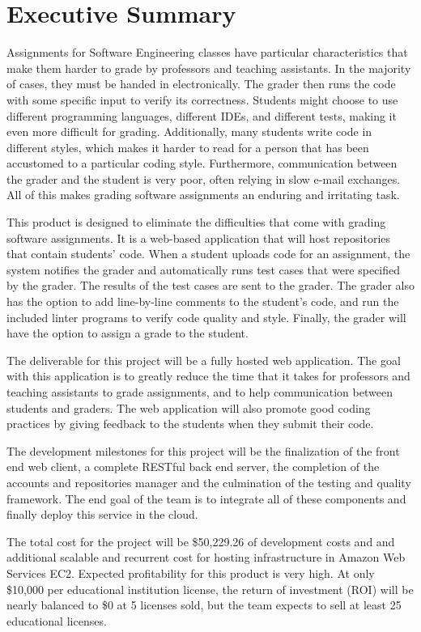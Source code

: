 \part*{Executive Summary}

Assignments for Software Engineering classes have particular characteristics
that make them harder to grade by professors and teaching assistants. In the
majority of cases, they must be handed in electronically. The grader then runs
the code with some specific input to verify its correctness. Students might
choose to use different programming languages, different IDEs, and different
tests, making it even more difficult for grading. Additionally, many students
write code in different styles, which makes it harder to read for a person
that has been accustomed to a particular coding style. Furthermore,
communication between the grader and the student is very poor, often relying
in slow e-mail exchanges.  All of this makes grading software assignments an
enduring and irritating task.

This product is designed to eliminate the difficulties that come with grading
software assignments. It is a web-based application that will host
repositories that contain students' code. When a student uploads code for an
assignment, the system notifies the grader and automatically runs test cases
that were specified by the grader. The results of the test cases are sent to
the grader. The grader also has the option to add line-by-line comments to the
student's code, and run the included linter programs to verify code quality
and style. Finally, the grader will have the option to assign a grade to the
student.

The deliverable for this project will be a fully hosted web application. The
goal with this application is to greatly reduce the time that it takes for
professors and teaching assistants to grade assignments, and to help
communication between students and graders. The web application will also
promote good coding practices by giving feedback to the students when they
submit their code.

The development milestones for this project will be the finalization of the
front end web client, a complete RESTful back end server, the completion of
the accounts and repositories manager and the culmination of the testing and
quality framework. The end goal of the team is to integrate all of these
components and finally deploy this service in the cloud.


The total cost for the project will be \$50,229.26 of development costs and
and additional scalable and recurrent cost for hosting infrastructure in
Amazon Web Services EC2. Expected profitability for this product is very high.
At only \$10,000 per educational institution license, the return of investment
(ROI) will be nearly balanced to \$0 at 5 licenses sold, but the team expects
to sell at least 25 educational licenses.

